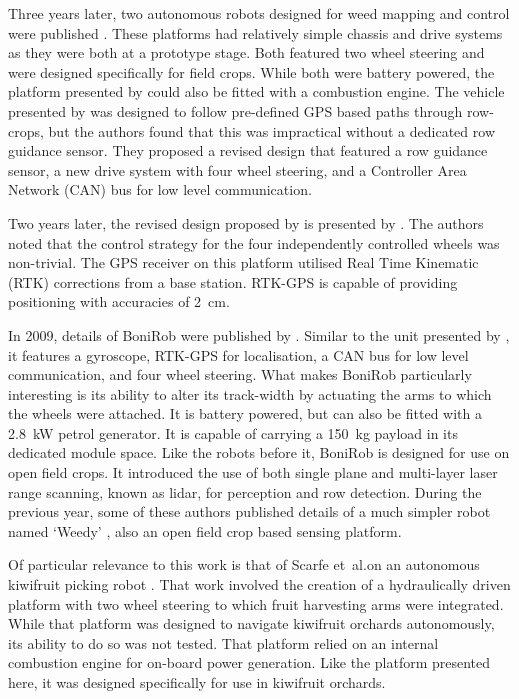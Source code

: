 \documentclass[preprint,authoryear,12pt]{elsarticle}
\begin{document}
        Three years later, two autonomous robots designed for weed mapping and control were published \citep{Pedersen2002,Astrand2002}.
        These platforms had relatively simple chassis and drive systems as they were both at a prototype stage.
        Both featured two wheel steering and were designed specifically for field crops.
        While both were battery powered, the platform presented by \cite{Astrand2002} could also be fitted with a combustion engine.
        The vehicle presented by \cite{Pedersen2002} was designed to follow pre-defined GPS based paths through row-crops, but the authors found that this was impractical without a dedicated row guidance sensor.
        They proposed a revised design that featured a row guidance sensor, a new drive system with four wheel steering, and a Controller Area Network (CAN) bus for low level communication.

        Two years later, the revised design proposed by \cite{Pedersen2002} is presented by \cite{Bak2004}.
        The authors noted that the control strategy for the four independently controlled wheels was non-trivial.
        The GPS receiver on this platform utilised Real Time Kinematic (RTK) corrections from a base station.
        RTK-GPS is capable of providing positioning with accuracies of \SI{2}{\centi\meter}.

        In 2009, details of BoniRob were published by \cite{Ruckelshausen2009}.
        Similar to the unit presented by \cite{Bak2004}, it features a gyroscope, RTK-GPS for localisation, a CAN bus for low level communication, and four wheel steering.
        What makes BoniRob particularly interesting is its ability to alter its track-width by actuating the arms to which the wheels were attached.
        It is battery powered, but can also be fitted with a \SI{2.8}{\kilo\watt} petrol generator.
        It is capable of carrying a \SI{150}{\kilo\gram} payload in its dedicated module space.
        Like the robots before it, BoniRob is designed for use on open field crops.
        It introduced the use of both single plane and multi-layer laser range scanning, known as lidar, for perception and row detection.
        During the previous year, some of these authors published details of a much simpler robot named `Weedy' \citep{Klose2008}, also an open field crop based sensing platform.

        Of particular relevance to this work is that of Scarfe et~al.\@ on an autonomous kiwifruit picking robot \citep{scarfe2009, Scarfe2012}.
        That work involved the creation of a hydraulically driven platform with two wheel steering to which fruit harvesting arms were integrated.
        While that platform was designed to navigate kiwifruit orchards autonomously, its ability to do so was not tested.
        That platform relied on an internal combustion engine for on-board power generation.
        Like the platform presented here, it was designed specifically for use in kiwifruit orchards.
\end{document}
